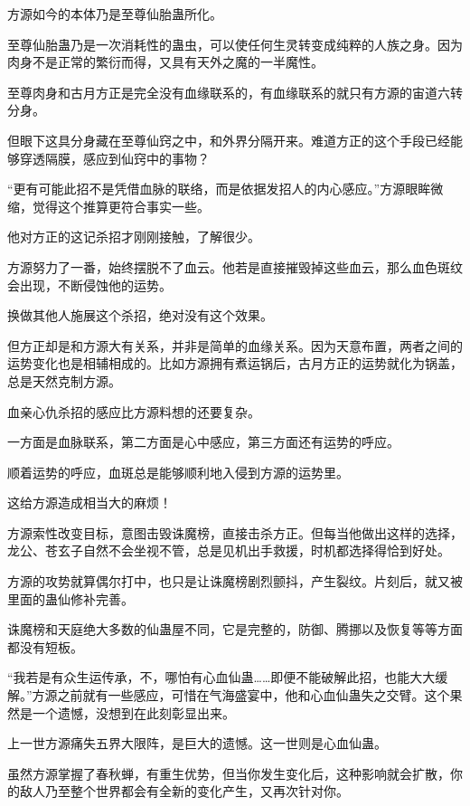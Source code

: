 
\begin{this_body}

方源如今的本体乃是至尊仙胎蛊所化。

至尊仙胎蛊乃是一次消耗性的蛊虫，可以使任何生灵转变成纯粹的人族之身。因为肉身不是正常的繁衍而得，又具有天外之魔的一半魔性。

至尊肉身和古月方正是完全没有血缘联系的，有血缘联系的就只有方源的宙道六转分身。

但眼下这具分身藏在至尊仙窍之中，和外界分隔开来。难道方正的这个手段已经能够穿透隔膜，感应到仙窍中的事物？

“更有可能此招不是凭借血脉的联络，而是依据发招人的内心感应。”方源眼眸微缩，觉得这个推算更符合事实一些。

他对方正的这记杀招才刚刚接触，了解很少。

方源努力了一番，始终摆脱不了血云。他若是直接摧毁掉这些血云，那么血色斑纹会出现，不断侵蚀他的运势。

换做其他人施展这个杀招，绝对没有这个效果。

但方正却是和方源大有关系，并非是简单的血缘关系。因为天意布置，两者之间的运势变化也是相辅相成的。比如方源拥有煮运锅后，古月方正的运势就化为锅盖，总是天然克制方源。

血亲心仇杀招的感应比方源料想的还要复杂。

一方面是血脉联系，第二方面是心中感应，第三方面还有运势的呼应。

顺着运势的呼应，血斑总是能够顺利地入侵到方源的运势里。

这给方源造成相当大的麻烦！

方源索性改变目标，意图击毁诛魔榜，直接击杀方正。但每当他做出这样的选择，龙公、苍玄子自然不会坐视不管，总是见机出手救援，时机都选择得恰到好处。

方源的攻势就算偶尔打中，也只是让诛魔榜剧烈颤抖，产生裂纹。片刻后，就又被里面的蛊仙修补完善。

诛魔榜和天庭绝大多数的仙蛊屋不同，它是完整的，防御、腾挪以及恢复等等方面都没有短板。

“我若是有众生运传承，不，哪怕有心血仙蛊……即便不能破解此招，也能大大缓解。”方源之前就有一些感应，可惜在气海盛宴中，他和心血仙蛊失之交臂。这个果然是一个遗憾，没想到在此刻彰显出来。

上一世方源痛失五界大限阵，是巨大的遗憾。这一世则是心血仙蛊。

虽然方源掌握了春秋蝉，有重生优势，但当你发生变化后，这种影响就会扩散，你的敌人乃至整个世界都会有全新的变化产生，又再次针对你。


\end{this_body}
